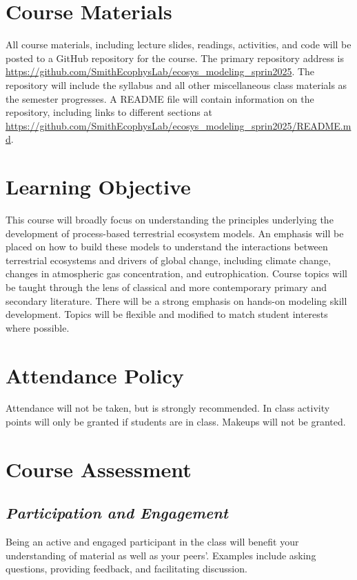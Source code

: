 \documentclass[12pt, notitlepage]{article}   	%
\begin{document}
{\section{Course Materials}
All course materials, including lecture slides, readings, activities, and code 
will be posted to a GitHub repository for the course.
The primary repository address is
\url{https://github.com/SmithEcophysLab/ecosys_modeling_sprin2025}.
The repository will include the syllabus and all other miscellaneous class materials as the semester
progresses. A README file will contain information on the repository, including
links to different sections at 
\url{https://github.com/SmithEcophysLab/ecosys_modeling_sprin2025/README.md}.

\section{Learning Objective}
This course will broadly focus on understanding the principles underlying the development of
process-based terrestrial ecosystem models. An emphasis will be placed on how to build these
models to understand the interactions between terrestrial ecosystems and drivers of global
change, including climate change, changes in atmospheric gas concentration, and eutrophication.
Course topics will be taught through the lens of classical and more contemporary 
primary and secondary literature. There will be a strong emphasis on hands-on modeling skill
development. Topics will be flexible and modified to match student interests where possible.

\section{Attendance Policy}
Attendance will not be taken, but is strongly recommended. 
In class activity points will only be granted if students are in class.
Makeups will not be granted.

\section{Course Assessment}
\subsection{\textit{Participation and Engagement}}
Being an active and engaged participant in the class will benefit your understanding
of material as well as your peers'. Examples include asking questions, providing feedback,
and facilitating discussion.

}
\end{document}
